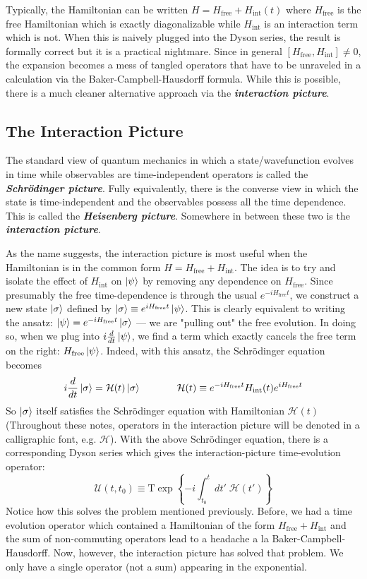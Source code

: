 \documentclass[onecolumn]{gwclass}
\renewcommand{\t}[1]{\text{#1}}
\def \timeorder{\t{T}}
\begin{document}
Typically, the Hamiltonian can be written $H=H_\t{free} + H_\t{int}(t)$ where $H_\t{free}$ is the free Hamiltonian which is exactly diagonalizable while $H_\t{int}$ is an interaction term which is not. When this is naively plugged into the Dyson series, the result is formally correct but it is a practical nightmare. Since in general $[H_\t{free}, H_\t{int}]\neq 0$, the expansion becomes a mess of tangled operators that have to be unraveled in a calculation via the Baker-Campbell-Hausdorff formula. While this is possible, there is a much cleaner alternative approach via the \textbf{\emph{interaction picture}}.

\subsection{The Interaction Picture}
The standard view of quantum mechanics in which a state/wavefunction evolves in time while observables are time-independent operators is called the \textbf{\emph{Schr\"odinger picture}}. Fully equivalently, there is the converse view in which the state is time-independent and the observables possess all the time dependence. This is called the \textbf{\emph{Heisenberg picture}}. Somewhere in between these two is the \textbf{\emph{interaction picture}}.

As the name suggests, the interaction picture is most useful when the Hamiltonian is in the common form $H=H_\t{free} + H_\t{int}$. The idea is to try and isolate the effect of $H_\t{int}$ on $\ket{\psi}$ by removing any dependence on $H_\t{free}$. Since presumably the free time-dependence is through the usual $e^{-iH_\t{free}t}$, we construct a new state $\ket{\sigma}$ defined by $\ket{\sigma}\equiv e^{iH_\t{free}t}\ket{\psi}$. This is clearly equivalent to writing the ansatz: $\ket{\psi}=e^{-iH_\t{free}t}\ket{\sigma}$ --- we are "pulling out" the free evolution. In doing so, when we plug into $i\frac{d}{dt}\ket{\psi}$, we find a term which exactly cancels the free term on the right: $H_\t{free}\ket{\psi}$. Indeed, with this ansatz, the Schr\"odinger equation becomes
$$ i\frac{d}{dt}\ket{\sigma} = \mathcal{H}(t)\ket{\sigma} \hspace{0.5in}  \mathcal{H}(t)\equiv e^{-iH_\t{free}t}H_\t{int}(t)e^{iH_\t{free}t}$$
So $\ket{\sigma}$ itself satisfies the Schr\"odinger equation with Hamiltonian $\mathcal{H}(t)$ (Throughout these notes, operators in the interaction picture will be denoted in a calligraphic font, e.g. $\mathcal{H}$). With the above Schr\"odinger equation, there is a corresponding Dyson series which gives the interaction-picture time-evolution operator:
$$ \mathcal{U}(t,t_0) \equiv \timeorder\exp\left\{ -i\int_{t_0}^t dt'\;\mathcal{H}(t') \right\} $$
Notice how this solves the problem mentioned previously. Before, we had a time evolution operator which contained a Hamiltonian of the form $H_\t{free}+H_\t{int}$ and the sum of non-commuting operators lead to a headache a la Baker-Campbell-Hausdorff. Now, however, the interaction picture has solved that problem. We only have a single operator (not a sum) appearing in the exponential.
\end{document}
